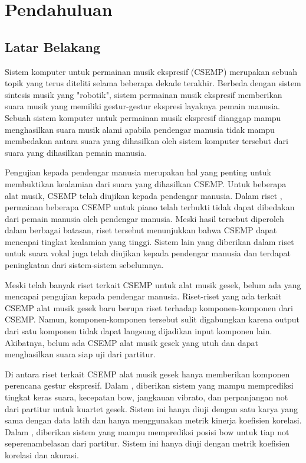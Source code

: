 \chapter{Pendahuluan}

\section{Latar Belakang}

Sistem komputer untuk permainan musik ekspresif (CSEMP) merupakan sebuah topik yang terus diteliti selama beberapa dekade terakhir. Berbeda dengan sistem sintesis musik yang "robotik", sistem permainan musik ekspresif memberikan suara musik yang memiliki gestur-gestur ekspresi layaknya pemain manusia. Sebuah sistem komputer untuk permainan musik ekspresif dianggap mampu menghasilkan suara musik alami apabila pendengar manusia tidak mampu membedakan antara suara yang dihasilkan oleh sistem komputer tersebut dari suara yang dihasilkan pemain manusia.

Pengujian kepada pendengar manusia merupakan hal yang penting untuk membuktikan kealamian dari suara yang dihasilkan CSEMP. Untuk beberapa alat musik, CSEMP telah diujikan kepada pendengar manusia. Dalam riset \cite{schubert2017test}, permainan beberapa CSEMP untuk piano telah terbukti tidak dapat dibedakan dari pemain manusia oleh pendengar manusia. Meski hasil tersebut diperoleh dalam berbagai batasan, riset tersebut menunjukkan bahwa CSEMP dapat mencapai tingkat kealamian yang tinggi. Sistem lain yang diberikan dalam riset \cite{bonada2017singing} untuk suara vokal juga telah diujikan kepada pendengar manusia dan terdapat peningkatan dari sistem-sistem sebelumnya.

Meski telah banyak riset terkait CSEMP untuk alat musik gesek, belum ada yang mencapai pengujian kepada pendengar manusia. Riset-riset yang ada terkait CSEMP alat musik gesek baru berupa riset terhadap komponen-komponen dari CSEMP. Namun, komponen-komponen tersebut sulit digabungkan karena output dari satu komponen tidak dapat langsung dijadikan input komponen lain. Akibatnya, belum ada CSEMP alat musik gesek yang utuh dan dapat menghasilkan suara siap uji dari partitur.

Di antara riset terkait CSEMP alat musik gesek hanya memberikan komponen perencana gestur ekspresif. Dalam \parencite{marchini2014quartet}, diberikan sistem yang mampu memprediksi tingkat keras suara, kecepatan bow, jangkauan vibrato, dan perpanjangan not dari partitur untuk kuartet gesek. Sistem ini hanya diuji dengan satu karya yang sama dengan data latih dan hanya menggunakan metrik kinerja koefisien korelasi. Dalam \parencite{yu2017bowing}, diberikan sistem yang mampu memprediksi posisi bow untuk tiap not seperenambelasan dari partitur. Sistem ini hanya diuji dengan metrik koefisien korelasi dan akurasi.

